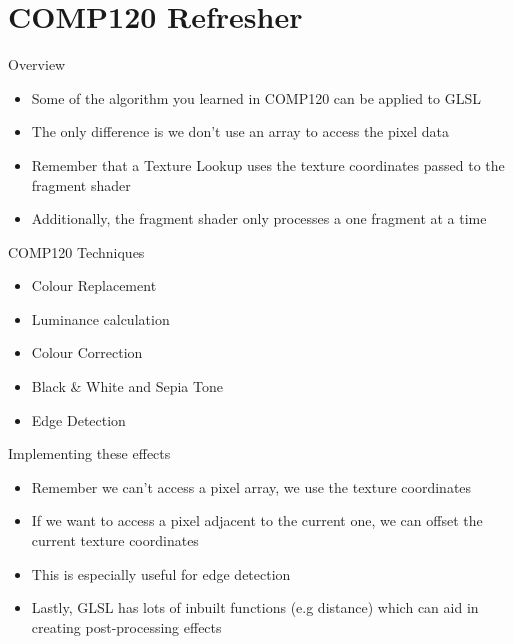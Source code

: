 \part{COMP120 Refresher}
\frame{\partpage}

\begin{frame}{Overview}
	\begin{itemize}
		\item\pause Some of the algorithm you learned in COMP120 can be applied to GLSL
		\item\pause The only difference is we don't use an array to access the pixel data
		\item\pause Remember that a Texture Lookup uses the texture coordinates passed to the fragment shader
		\item\pause Additionally, the fragment shader only processes a one fragment at a time
	\end{itemize}
\end{frame}

\begin{frame}{COMP120 Techniques}
	\begin{itemize}
		\item Colour Replacement
		\item Luminance calculation  
		\item Colour Correction
		\item Black \& White and Sepia Tone
		\item Edge Detection
	\end{itemize}
\end{frame}

\begin{frame}{Implementing these effects}
	\begin{itemize}
		\item\pause Remember we can't access a pixel array, we use the texture coordinates
		\item\pause If we want to access a pixel adjacent to the current one, we can offset the current texture coordinates
		\item\pause This is especially useful for edge detection
		\item\pause Lastly, GLSL has lots of inbuilt functions (e.g distance) which can aid in creating post-processing effects
	\end{itemize}
\end{frame}